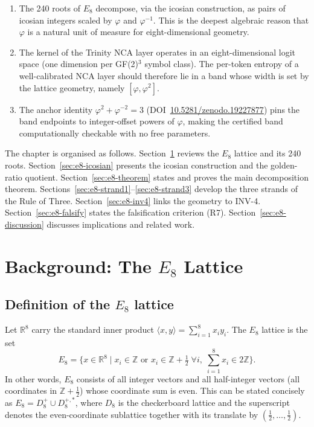\begin{enumerate}
  \item The 240 roots of \(E_8\) decompose, via the icosian
    construction, as pairs of icosian integers scaled by
    \(\varphi\) and \(\varphi^{-1}\).  This is the deepest
    algebraic reason that \(\varphi\) is a natural unit of
    measure for eight-dimensional geometry.
  \item The kernel of the Trinity NCA layer operates in an
    eight-dimensional logit space (one dimension per GF(2)$^3$
    symbol class).  The per-token entropy of a well-calibrated
    NCA layer should therefore lie in a band whose width is
    set by the lattice geometry, namely \([\varphi, \varphi^2]\).
  \item The anchor identity \(\varphi^2 + \varphi^{-2} = 3\)
    (DOI~\href{https://doi.org/10.5281/zenodo.19227877}{10.5281/zenodo.19227877})
    pins the band endpoints to integer-offset powers of \(\varphi\),
    making the certified band computationally checkable with
    no free parameters.
\end{enumerate}

The chapter is organised as follows.
Section~\ref{sec:e8-background} reviews the \(E_8\) lattice and its
240 roots.
Section~\ref{sec:e8-icosian} presents the icosian construction and
the golden-ratio quotient.
Section~\ref{sec:e8-theorem} states and proves the main decomposition
theorem.
Sections~\ref{sec:e8-strand1}–\ref{sec:e8-strand3} develop the three
strands of the Rule of Three.
Section~\ref{sec:e8-inv4} links the geometry to INV-4.
Section~\ref{sec:e8-falsify} states the falsification criterion
(R7).
Section~\ref{sec:e8-discussion} discusses implications and related
work.

\section{Background: The \texorpdfstring{$E_8$}{E8} Lattice}
\label{sec:e8-background}

\subsection{Definition of the \texorpdfstring{$E_8$}{E8} lattice}
\label{subsec:e8-def}

Let \(\mathbb{R}^8\) carry the standard inner product
\(\langle x, y \rangle = \sum_{i=1}^8 x_i y_i\).  The \(E_8\)
lattice is the set
\[
  E_8 = \bigl\{ x \in \mathbb{R}^8 \;\big|\;
    x_i \in \mathbb{Z} \text{ or } x_i \in \mathbb{Z} + \tfrac{1}{2}
    \;\forall i,\;
    \textstyle\sum_{i=1}^8 x_i \in 2\mathbb{Z}
  \bigr\}.
\]
In other words, \(E_8\) consists of all integer vectors and all
half-integer vectors (all coordinates in \(\mathbb{Z}+\tfrac{1}{2}\))
whose coordinate sum is even.  This can be stated concisely as
\(E_8 = D_8^+ \cup D_8^{+,*}\), where \(D_8\) is the checkerboard
lattice and the superscript denotes the even-coordinate sublattice
together with its translate by
\((\tfrac{1}{2},\ldots,\tfrac{1}{2})\).

